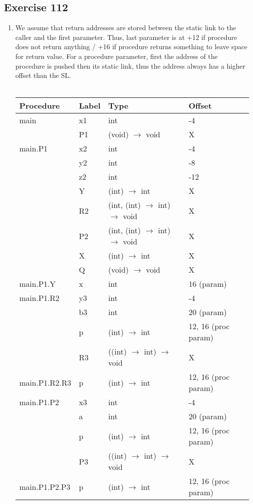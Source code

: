 \documentclass[12pt,fleqn]{article}		%
\begin{document}
\subsection{Exercise 112}
\begin{enumerate}
\item We assume that return addresses are stored between the static link to the caller and the first parameter. Thus, last parameter is at +12 if procedure does not return anything / +16 if procedure returns something to leave space for return value. For a procedure parameter, first the address of the procedure is pushed then its static link, thus the address always has a higher offset than the SL.\\\\
\begin{tabularx}{\textwidth}{| l || l | X | l |}
\hline
Procedure & Label & Type & Offset\\
\hline
main & x1 & int & -4\\
& P1 & (void) $\rightarrow$ void & X\\
\hline
main.P1 & x2 & int & -4\\
& y2 & int & -8\\
& z2 & int & -12\\
& Y & (int) $\rightarrow$ int & X\\
& R2 & (int, (int) $\rightarrow$ int) $\rightarrow$ void & X\\
& P2 & (int, (int) $\rightarrow$ int) $\rightarrow$ void & X\\
& X & (int) $\rightarrow$ int & X\\
& Q & (void) $\rightarrow$ void & X\\
\hline
main.P1.Y & x & int & 16 (param)\\
\hline
main.P1.R2 & y3 & int & -4\\
& b3 & int & 20 (param)\\
& p & (int) $\rightarrow$ int & 12, 16 (proc param)\\
& R3 & ((int) $\rightarrow$ int) $\rightarrow$ void & X\\
\hline
main.P1.R2.R3 & p & (int) $\rightarrow$ int & 12, 16 (proc param)\\
\hline
main.P1.P2 & x3 & int &-4\\
& a & int & 20 (param)\\
& p & (int) $\rightarrow$ int & 12, 16 (proc param)\\
& P3 & ((int) $\rightarrow$ int) $\rightarrow$ void & X\\
\hline
main.P1.P2.P3 & p & (int) $\rightarrow$ int & 12, 16 (proc param)\\

\end{tabularx}
\end{enumerate}
\end{document}
